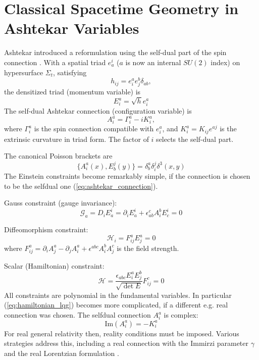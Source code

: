 \documentclass[11pt,a4paper]{article}
\theoremstyle{definition}
\begin{document}
	\section{Classical Spacetime Geometry in Ashtekar Variables}
	Ashtekar introduced a reformulation using the self-dual part of the spin connection \cite{ashtekar1986,ashtekar1987}. 
	With a spatial triad $e^i_a$ ($a$ is now an internal $SU(2)$ index) on hypersurface $\Sigma_t$, satisfying
	\begin{equation}
		h_{ij} = e^a_i e^b_j \delta_{ab} ,
	\end{equation}
	the densitized triad (momentum variable) is
	\begin{equation}
		E^a_i = \sqrt{h} e^a_i
		\label{eq:densitized_triad}
	\end{equation}
	The self-dual Ashtekar connection (configuration variable) is
	\begin{equation}
		A^a_i = \Gamma^a_i - i K^a_i  ,
		\label{eq:ashtekar_connection}
	\end{equation}
	where $\Gamma^a_i$ is the spin connection compatible with $e^a_i$, and $K^a_i = K_{ij}e^{aj}$ is the extrinsic curvature in triad form. The factor of $i$ selects the self-dual part.
	
	The canonical Poisson brackets are
	\begin{equation}
		\{A^a_i(x), E^j_b(y)\} = \delta^a_b\delta^j_i\delta^3(x,y)
		\label{eq:poisson_ashtekar}
	\end{equation}
	The Einstein constraints become remarkably simple, if the connection is chosen to be the selfdual one (\ref{eq:ashtekar_connection}). 
	
	{Gauss constraint (gauge invariance):}
	\begin{equation}
		\mathcal{G}_a = D_i E^i_a = \partial_i E^i_a + \epsilon_{ab}^c A^b_i E^i_c = 0
		\label{eq:gauss}
	\end{equation}
	
	{Diffeomorphism constraint:}
	\begin{equation}
		\mathcal{H}_i = F^a_{ij}E^a_j = 0
		\label{eq:diffeo}
	\end{equation}
	where $F^a_{ij} = \partial_i A^a_j - \partial_j A^a_i + \epsilon^{abc}A^b_i A^c_j$ is the field strength.
	
	{Scalar (Hamiltonian) constraint:}
	\begin{equation}
		\mathcal{H} = \frac{\epsilon_{abc}E^a_i E^b_j}{\sqrt{\det E}}F^c_{ij} = 0
		\label{eq:hamiltonian_lqg}
	\end{equation}
	All constraints are polynomial in the fundamental variables. In particular (\ref{eq:hamiltonian_lqg}) becomes more complicated, if a different e.g. real connection was chosen. 
	The selfdual connection $A^a_i$ is complex: 
	\begin{equation}
		\text{Im}(A^a_i) = -K^a_i
	\end{equation}
	For real general relativity then, reality conditions must be imposed. Various strategies address this, including a real connection with the Immirzi parameter $\gamma$ \cite{barbero1995} and the real Lorentzian formulation \cite{thiemann2007}.
	
\end{document}
